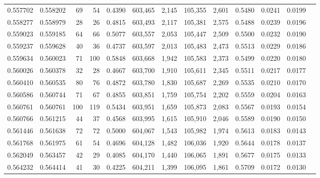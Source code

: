 \begin{tabular}{rrrrrrrrrrrrr}
0.557702 & 0.558202 &    69 &    54 &                                     0.4390 & 603,465 &   2,145 & 105,355 &   2,601 & 0.5480 & 0.0241 & 0.0199 \\
0.558277 & 0.558979 &    28 &    26 &                                     0.4815 & 603,493 &   2,117 & 105,381 &   2,575 & 0.5488 & 0.0239 & 0.0196 \\
0.559023 & 0.559185 &    64 &    66 &                                     0.5077 & 603,557 &   2,053 & 105,447 &   2,509 & 0.5500 & 0.0232 & 0.0190 \\
0.559237 & 0.559628 &    40 &    36 &                                     0.4737 & 603,597 &   2,013 & 105,483 &   2,473 & 0.5513 & 0.0229 & 0.0186 \\
0.559634 & 0.560023 &    71 &   100 &                                     0.5848 & 603,668 &   1,942 & 105,583 &   2,373 & 0.5499 & 0.0220 & 0.0180 \\
0.560026 & 0.560378 &    32 &    28 &                                     0.4667 & 603,700 &   1,910 & 105,611 &   2,345 & 0.5511 & 0.0217 & 0.0177 \\
0.560410 & 0.560535 &    80 &    76 &                                     0.4872 & 603,780 &   1,830 & 105,687 &   2,269 & 0.5535 & 0.0210 & 0.0170 \\
0.560586 & 0.560744 &    71 &    67 &                                     0.4855 & 603,851 &   1,759 & 105,754 &   2,202 & 0.5559 & 0.0204 & 0.0163 \\
0.560761 & 0.560761 &   100 &   119 &                                     0.5434 & 603,951 &   1,659 & 105,873 &   2,083 & 0.5567 & 0.0193 & 0.0154 \\
0.560766 & 0.561215 &    44 &    37 &                                     0.4568 & 603,995 &   1,615 & 105,910 &   2,046 & 0.5589 & 0.0190 & 0.0150 \\
0.561446 & 0.561638 &    72 &    72 &                                     0.5000 & 604,067 &   1,543 & 105,982 &   1,974 & 0.5613 & 0.0183 & 0.0143 \\
0.561768 & 0.561975 &    61 &    54 &                                     0.4696 & 604,128 &   1,482 & 106,036 &   1,920 & 0.5644 & 0.0178 & 0.0137 \\
0.562049 & 0.563457 &    42 &    29 &                                     0.4085 & 604,170 &   1,440 & 106,065 &   1,891 & 0.5677 & 0.0175 & 0.0133 \\
0.564232 & 0.564414 &    41 &    30 &                                     0.4225 & 604,211 &   1,399 & 106,095 &   1,861 & 0.5709 & 0.0172 & 0.0130 \\

\end{tabular}

